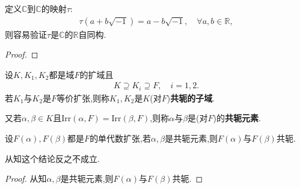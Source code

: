 \documentclass[../../main.tex]{subfiles}%
\begin{document}
\begin{example}
定义$\mathbb{C}$到$\mathbb{C}$的映射$\tau$:
\begin{align*}
\tau(a+b\sqrt{-1})=a-b\sqrt{-1},\quad \forall a,b\in\mathbb{R},
\end{align*}
则容易验证$\tau$是$\mathbb{C}$的$\mathbb{R}$自同构.
\end{example}
\begin{proof}

\end{proof}

\begin{definition}
设$K,K_1,K_2$都是域$F$的扩域且
\begin{align*}
K\supseteq K_i\supseteq F,\quad i=1,2.
\end{align*}
若$K_1$与$K_2$是$F$等价扩张,则称$K_1,K_2$是$K$(对$F$)\textbf{共轭的子域}.

又若$\alpha,\beta\in K$且$\mathrm{Irr}(\alpha,F)=\mathrm{Irr}(\beta,F)$,则称$\alpha$与$\beta$是(对$F$)的\textbf{共轭元素}.
\end{definition}

\begin{proposition}
设$F(\alpha),F(\beta)$都是$F$的单代数扩张,若$\alpha,\beta$是共轭元素,则$F(\alpha)$与$F(\beta)$共轭.
\end{proposition}
\begin{remark}
从知这个结论反之不成立.
\end{remark}
\begin{proof}
从知$\alpha,\beta$是共轭元素,则$F(\alpha)$与$F(\beta)$共轭.
\end{proof}
\end{document}
